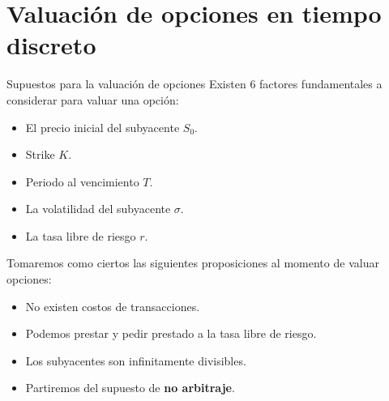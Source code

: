 \documentclass[11pt]{beamer}
\begin{document}
\section{Valuación de opciones en tiempo discreto}

\begin{frame}{Supuestos para la valuación de opciones}
	Existen 6 factores fundamentales a considerar para valuar una opción:\begin{itemize}
		\item El precio inicial del subyacente $S_0$.
		\item Strike $K$.
		\item Periodo al vencimiento $T$.
		\item La volatilidad del subyacente $\sigma$.
		\item La tasa libre de riesgo $r$.
	\end{itemize}
	
	Tomaremos como ciertos las siguientes proposiciones al momento de valuar opciones:
	\begin{itemize}
		\item No existen costos de transacciones.
		\item Podemos prestar y pedir prestado a la tasa libre de riesgo.
		\item Los subyacentes son infinitamente divisibles.
		\item Partiremos del supuesto de \textbf{no arbitraje}.
	\end{itemize}
\end{frame}
\end{document}
